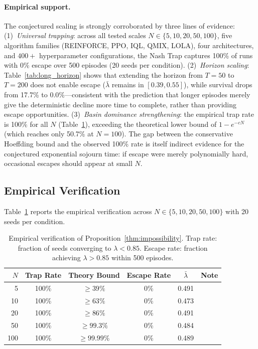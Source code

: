 \paragraph{Empirical support.}
The conjectured scaling is strongly corroborated by three lines of evidence: (1)~\emph{Universal trapping}: across all tested scales $N \in \{5, 10, 20, 50, 100\}$, five algorithm families (REINFORCE, PPO, IQL, QMIX, LOLA), four architectures, and $400{+}$ hyperparameter configurations, the Nash Trap captures 100\% of runs with 0\% escape over 500 episodes (20 seeds per condition). (2)~\emph{Horizon scaling}: Table~\ref{tab:long_horizon} shows that extending the horizon from $T{=}50$ to $T{=}200$ does not enable escape ($\bar\lambda$ remains in $[0.39, 0.55]$), while survival drops from 17.7\% to 0.0\%---consistent with the prediction that longer episodes merely give the deterministic decline more time to complete, rather than providing escape opportunities. (3)~\emph{Basin dominance strengthening}: the empirical trap rate is 100\% for all $N$ (Table~\ref{tab:impossibility_empirical}), exceeding the theoretical lower bound of $1{-}e^{-cN}$ (which reaches only 50.7\% at $N{=}100$). The gap between the conservative Hoeffding bound and the observed 100\% rate is itself indirect evidence for the conjectured exponential sojourn time: if escape were merely polynomially hard, occasional escapes should appear at small $N$.
\qedhere


\subsection{Empirical Verification}
\label{app:impossibility_empirical}

Table~\ref{tab:impossibility_empirical} reports the
empirical verification across $N \in \{5, 10, 20, 50, 100\}$
with 20 seeds per condition.

\begin{table}[h]
\centering
\caption{Empirical verification of Proposition~\ref{thm:impossibility}.
  Trap rate: fraction of seeds converging to $\lambda < 0.85$.
  Escape rate: fraction achieving $\lambda > 0.85$ within 500 episodes.}
\label{tab:impossibility_empirical}
\small
\begin{tabular}{@{}rccccl@{}}
\toprule
$N$ & Trap Rate & Theory Bound & Escape Rate & $\bar{\lambda}$ & Note \\
\midrule
5   & 100\%  & $\geq 39\%$  & 0\%  & 0.491 & \\
10  & 100\%  & $\geq 63\%$  & 0\%  & 0.473 & \\
20  & 100\%  & $\geq 86\%$  & 0\%  & 0.491 & \\
50  & 100\%  & $\geq 99.3\%$& 0\%  & 0.484 & \\
100 & 100\%  & $\geq 99.99\%$& 0\% & 0.489 & \\
\bottomrule
\end{tabular}
\end{table}

